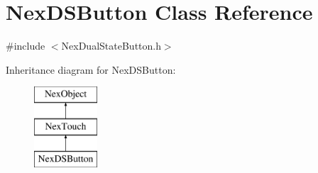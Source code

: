 \hypertarget{class_nex_d_s_button}{\section{Nex\+D\+S\+Button Class Reference}
\label{class_nex_d_s_button}
}


{\ttfamily \#include $<$Nex\+Dual\+State\+Button.\+h$>$}

Inheritance diagram for Nex\+D\+S\+Button\+:\begin{figure}[H]
\begin{center}
\leavevmode
\includegraphics[height=3.000000cm]{class_nex_d_s_button}
\end{center}
\end{figure}
